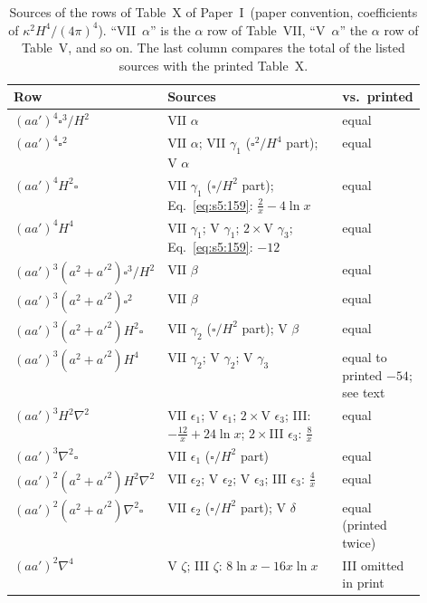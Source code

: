 \documentclass[aps,prd,onecolumn,10pt,nofootinbib,floatfix]{revtex4-2}
\newcommand{\PI}{Paper~I}
\begin{document}
\begin{table}[tb]
\caption{Sources of the rows of Table~X of \PI\ (paper convention, coefficients of $\kappa^2H^4/(4\pi)^4$). ``VII~$\alpha$'' is the $\alpha$ row of Table~VII, ``V~$\alpha$'' the $\alpha$ row of Table~V, and so on. The last column compares the total of the listed sources with the printed Table~X.}
\label{tab:s5:assembly}
\renewcommand{\arraystretch}{1.3}
\begin{ruledtabular}
\begin{tabular}{lp{0.53\linewidth}l}
Row & Sources & vs.\ printed\\
\hline
$(aa')^4\square^3/H^2$ & VII $\alpha$ & equal\\
$(aa')^4\square^2$ & VII $\alpha$; VII $\gamma_1$ ($\square^2/H^4$ part); V $\alpha$ & equal\\
$(aa')^4H^2\square$ & VII $\gamma_1$ ($\square/H^2$ part); Eq.~\eqref{eq:s5:159}: $\frac2x-4\ln x$ & equal\\
$(aa')^4H^4$ & VII $\gamma_1$; V $\gamma_1$; $2\times$V $\gamma_3$; Eq.~\eqref{eq:s5:159}: $-12$ & equal\\
$(aa')^3(a^2+a'^2)\square^3/H^2$ & VII $\beta$ & equal\\
$(aa')^3(a^2+a'^2)\square^2$ & VII $\beta$ & equal\\
$(aa')^3(a^2+a'^2)H^2\square$ & VII $\gamma_2$ ($\square/H^2$ part); V $\beta$ & equal\\
$(aa')^3(a^2+a'^2)H^4$ & VII $\gamma_2$; V $\gamma_2$; V $\gamma_3$ & equal to printed $-54$; see text\\
$(aa')^3H^2\nabla^2$ & VII $\epsilon_1$; V $\epsilon_1$; $2\times$V $\epsilon_3$; III: $-\frac{12}x+24\ln x$; $2\times$III $\epsilon_3$: $\frac8x$ & equal\\
$(aa')^3\nabla^2\square$ & VII $\epsilon_1$ ($\square/H^2$ part) & equal\\
$(aa')^2(a^2+a'^2)H^2\nabla^2$ & VII $\epsilon_2$; V $\epsilon_2$; V $\epsilon_3$; III $\epsilon_3$: $\frac4x$ & equal\\
$(aa')^2(a^2+a'^2)\nabla^2\square$ & VII $\epsilon_2$ ($\square/H^2$ part); V $\delta$ & equal (printed twice)\\
$(aa')^2\nabla^4$ & V $\zeta$; III $\zeta$: $8\ln x-16x\ln x$ & III omitted in print\\
\end{tabular}
\end{ruledtabular}
\end{table}
\end{document}
